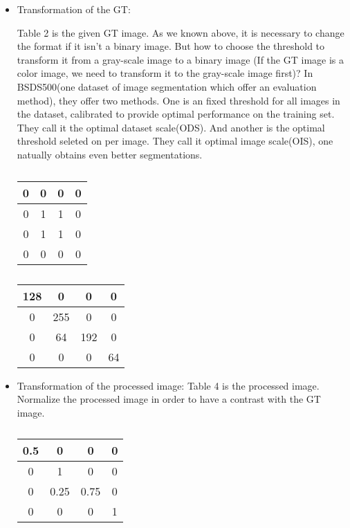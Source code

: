 \documentclass[a4paper,12pt]{article}
\begin{document}
\begin{itemize}

\item Transformation of the GT: %

Table 2 is the given GT image. As we known above, it is necessary to change the format if it isn't a binary image. But how to choose the threshold to transform it from a gray-scale image to a binary image (If the GT image is a color image, we need to transform it to the gray-scale image first)? In BSDS500(one dataset of image segmentation which offer an evaluation method), they offer two methods. One is an fixed threshold for all images in the dataset, calibrated to provide optimal performance on the training set. They call it the optimal dataset scale(ODS). And another is the optimal threshold seleted on per image. They call it optimal image scale(OIS), one natually obtains even better segmentations\cite{4:article}.
\begin{table}[h]
\centering
\begin{minipage}[t]{0.25\linewidth}
\caption{}
\begin{tabular}{|c|c|c|c|}
\hline
0&0&0&0\\
\hline
0&1&1&0\\
\hline
0&1&1&0\\
\hline
0&0&0&0\\
\hline
\end{tabular}
\end{minipage}
\begin{minipage}[t]{0.25\linewidth}
\caption{}
\begin{tabular}{|c|c|c|c|}
\hline
128&0&0&0\\
\hline
0&255&0&0\\
\hline
0&64&192&0\\
\hline
0&0&0&64\\
\hline
\end{tabular}
\end{minipage}
\end{table}

\item Transformation of the processed image: %
Table 4 is the processed image. Normalize the processed image in order to have a contrast with the GT image.
\begin{table}[ht]
\centering
\caption{}
\begin{tabular}{|c|c|c|c|}
\hline
0.5&0&0&0\\
\hline
0&1&0&0\\
\hline
0&0.25&0.75&0\\
\hline
0&0&0&1\\
\hline
\end{tabular}  
\end{table}


\end{itemize}
\end{document}
